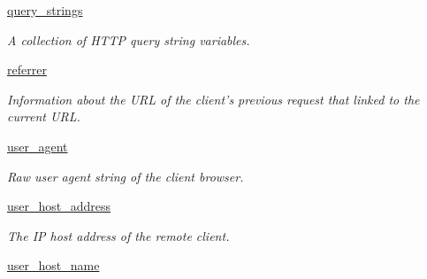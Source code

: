 \begin{DoxyCompactItemize}
\hyperlink{class_http_request_1_1_http_request_a1036f16b31416b249633c275ea53bfbf}{query\-\_\-strings}
\begin{DoxyCompactList}\small\item\em A collection of H\-T\-T\-P query string variables. \end{DoxyCompactList}\item 
\hyperlink{class_http_request_1_1_http_request_a4b7fa1c7de17ba07e72d76318a91d620}{referrer}
\begin{DoxyCompactList}\small\item\em Information about the U\-R\-L of the client's previous request that linked to the current U\-R\-L. \end{DoxyCompactList}\item 
\hypertarget{class_http_request_1_1_http_request_aa3401b62734dd571a97fe96ca602b9bd}{\hyperlink{class_http_request_1_1_http_request_aa3401b62734dd571a97fe96ca602b9bd}{user\-\_\-agent}}\label{class_http_request_1_1_http_request_aa3401b62734dd571a97fe96ca602b9bd}

\begin{DoxyCompactList}\small\item\em Raw user agent string of the client browser. \end{DoxyCompactList}\item 
\hypertarget{class_http_request_1_1_http_request_a87048d94b3202a3df3b2d6c244911057}{\hyperlink{class_http_request_1_1_http_request_a87048d94b3202a3df3b2d6c244911057}{user\-\_\-host\-\_\-address}}\label{class_http_request_1_1_http_request_a87048d94b3202a3df3b2d6c244911057}

\begin{DoxyCompactList}\small\item\em The I\-P host address of the remote client. \end{DoxyCompactList}\item 
\hypertarget{class_http_request_1_1_http_request_a840a019c70c9800a41259d80415c3d08}{\hyperlink{class_http_request_1_1_http_request_a840a019c70c9800a41259d80415c3d08}{user\-\_\-host\-\_\-name}}\label{class_http_request_1_1_http_request_a840a019c70c9800a41259d80415c3d08}


\end{DoxyCompactItemize}
